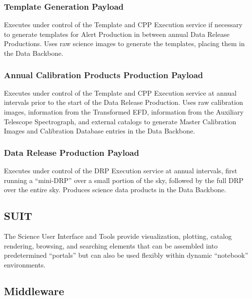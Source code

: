 \documentclass[DM,toc]{lsstdoc}
\begin{document}
\subsubsection{Template Generation
Payload}\label{template-generation-payload}

Executes under control of the Template and CPP Execution service if
necessary to generate templates for Alert Production in between annual
Data Release Productions. Uses raw science images to generate the
templates, placing them in the Data Backbone.

\subsubsection{Annual Calibration Products Production
Payload}\label{annual-calibration-products-production-payload}

Executes under control of the Template and CPP Execution service at
annual intervals prior to the start of the Data Release Production. Uses
raw calibration images, information from the Transformed EFD,
information from the Auxiliary Telescope Spectrograph, and external
catalogs to generate Master Calibration Images and Calibration Database
entries in the Data Backbone.

\subsubsection{Data Release Production
Payload}\label{data-release-production-payload}

Executes under control of the DRP Execution service at annual intervals,
first running a ``mini-DRP'' over a small portion of the sky, followed
by the full DRP over the entire sky. Produces science data products in
the Data Backbone.

\subsection{SUIT}\label{suit}

The Science User Interface and Tools provide visualization, plotting,
catalog rendering, browsing, and searching elements that can be
assembled into predetermined ``portals'' but can also be used flexibly
within dynamic ``notebook'' environments.

\subsection{Middleware}\label{middleware}
\end{document}
